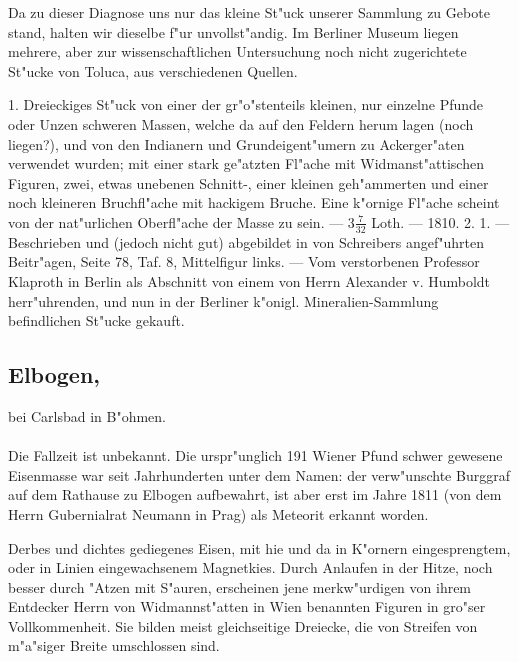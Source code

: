 \documentclass[a4paper, 11pt, oneside, polutonikogreek, german]{article}
\begin{document}
\setlength{\leftskip}{10mm}
\setlength{\parindent}{0pt}

{\footnotesize Da zu dieser Diagnose uns nur das kleine St"uck unserer Sammlung zu Gebote stand, halten wir dieselbe f"ur unvollst"andig. Im Berliner Museum liegen mehrere, aber zur wissenschaftlichen Untersuchung noch nicht zugerichtete St"ucke von Toluca, aus verschiedenen Quellen.}

\setlength{\leftskip}{0pt}
\setlength{\parindent}{20pt}

1. Dreieckiges St"uck von einer der gr"o"stenteils kleinen, nur einzelne Pfunde oder Unzen schweren Massen, welche da auf den Feldern herum lagen (noch liegen?), und von den Indianern und Grundeigent"umern zu Ackerger"aten verwendet wurden; mit einer stark ge"atzten Fl"ache mit Widmanst"attischen Figuren, zwei, etwas unebenen Schnitt-, einer kleinen geh"ammerten und einer noch kleineren Bruchfl"ache mit hackigem Bruche. Eine k"ornige Fl"ache scheint von der nat"urlichen Oberfl"ache der Masse zu sein. --- $3\frac{7}{32}$ Loth. --- 1810. 2. 1. --- Beschrieben und (jedoch nicht gut) abgebildet in von Schreibers angef"uhrten Beitr"agen, Seite 78, Taf. 8, Mittelfigur links. --- Vom verstorbenen Professor Klaproth in Berlin als Abschnitt von einem von Herrn Alexander v. Humboldt herr"uhrenden, und nun in der Berliner k"onigl. Mineralien-Sammlung befindlichen St"ucke gekauft.
\subsection[Elbogen.]{Elbogen,}
\begin{center}
\small
bei Carlsbad in B"ohmen.
\end{center}
\paragraph{}
Die Fallzeit ist unbekannt. Die urspr"unglich 191 Wiener Pfund schwer gewesene Eisenmasse war seit Jahrhunderten unter dem Namen: der verw"unschte Burggraf auf dem Rathause zu Elbogen aufbewahrt, ist aber erst im Jahre 1811 (von dem Herrn Gubernialrat Neumann in Prag) als Meteorit erkannt worden.

Derbes und dichtes gediegenes Eisen, mit hie und da in K"ornern eingesprengtem, oder in Linien eingewachsenem Magnetkies. Durch Anlaufen in der Hitze, noch besser durch "Atzen mit S"auren, erscheinen jene merkw"urdigen von ihrem Entdecker Herrn von Widmannst"atten in Wien benannten Figuren in gro"ser Vollkommenheit. Sie bilden meist gleichseitige Dreiecke, die von Streifen von m"a"siger Breite umschlossen sind.
\end{document}
